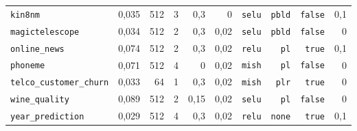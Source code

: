 \begin{table}[htbp]
\begin{tabular}{lrrrrrrrrr}
\texttt{kin8nm} & 0{,}035 & 512 & 3 & 0{,}3 & 0 & \texttt{selu} & \texttt{pbld} & \texttt{false} & 0{,}1 \\
\texttt{magictelescope} & 0{,}034 & 512 & 2 & 0{,}3 & 0{,}02 & \texttt{selu} & \texttt{pbld} & \texttt{false} & 0 \\
\texttt{online\_news} & 0{,}074 & 512 & 2 & 0{,}3 & 0{,}02 & \texttt{relu} & \texttt{pl} & \texttt{true} & 0{,}1 \\
\texttt{phoneme} & 0{,}071 & 512 & 4 & 0 & 0{,}02 & \texttt{mish} & \texttt{pl} & \texttt{false} & 0 \\
\texttt{telco\_\allowbreak customer\_\allowbreak churn} & 0{,}033 & 64 & 1 & 0{,}3 & 0{,}02 & \texttt{mish} & \texttt{plr} & \texttt{true} & 0 \\
\texttt{wine\_quality} & 0{,}089 & 512 & 2 & 0{,}15 & 0{,}02 & \texttt{selu} & \texttt{pl} & \texttt{false} & 0 \\
\texttt{year\_\allowbreak prediction} & 0{,}029 & 512 & 4 & 0{,}3 & 0{,}02 & \texttt{relu} & \texttt{none} & \texttt{true} & 0{,}1 \\
\bottomrule
\end{tabular}
\end{table}

